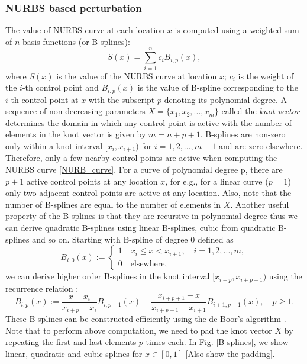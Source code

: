 \documentclass[review]{elsarticle}
\numberwithin{equation}{section}
\numberwithin{equation}{section}
\begin{document}
\subsubsection{NURBS based perturbation}
The value of NURBS curve at each location $x$ is computed using a weighted sum of $n$ basis functions (or B-splines):
\begin{equation}\label{NURB_curve}
S(x)  = \sum_{i=1}^{n} c_i B_{i,p}(x),
\end{equation}
where $S(x)$ is the value of the NURBS curve at location $x$; $c_i$ is the weight of the $i$-th control point and $B_{i,p}(x)$ is the value of B-spline corresponding to the $i$-th control point at $x$ with the subscript $p$ denoting its polynomial degree. A sequence of non-decreasing parameters $X = \{x_1,x_2,...,x_m\}$ called the \textit{knot vector} determines the domain in which any control point is active with the number of elements in the knot vector is given by $m = n+p+1$. B-splines are non-zero only within a knot interval $[x_i,x_{i+1})$ for $i = 1, 2, ..., m-1$ and are zero elsewhere. Therefore, only a few nearby control points are active when computing the NURBS curve \eqref{NURB_curve}. For a curve of polynomial degree p, there are $p+1$ active control points at any location $x$, for e.g., for a linear curve ($p=1$) only two adjacent control points are active at any location. Also, note that the number of B-splines are equal to the number of elements in $X$. Another useful property of the B-splines is that they are recursive in polynomial degree thus we can derive quadratic B-splines using linear B-splines, cubic from quadratic B-splines and so on. Starting with B-spline of degree 0 defined as 
\begin{equation}\label{linearBspline}
B_{i,0}(x) :=
\begin{cases}
1\quad x_i\leq x < x_{i+1},\quad i = 1,2,...,m,\\
0\quad\text{elsewhere,}
\end{cases} 
\end{equation}
we can derive higher order B-splines in the knot interval $[x_{i+p},x_{i+p+1})$ using the recurrence relation \cite{deBoor}:
\begin{equation}\label{NURBS_recurrence}
B_{i,p}(x) := \frac{x - x_i}{x_{i+p} - x_i}B_{i,p-1}(x) + \frac{x_{i+p+1}  -  x}{x_{i+p+1}  -  x_{i+1}}B_{i+1,p-1}(x),\quad p\geq1.
\end{equation} 
These B-splines can be constructed efficiently using the de Boor's algorithm \cite{deBoor}. Note that to perform above computation, we need to pad the knot vector $X$ by repeating the first and last elements $p$ times each. In Fig. \ref{B-splines}, we show linear, quadratic and cubic splines for $x\in[0,1]$ [Also show the padding]. 
\end{document}
